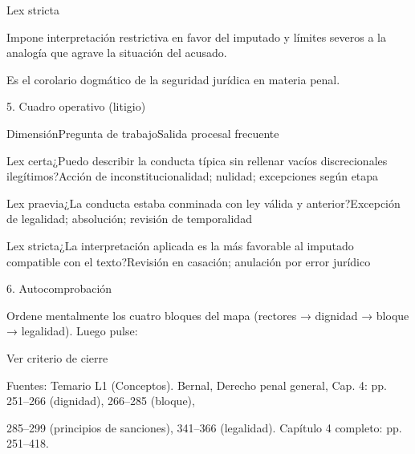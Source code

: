 \documentclass[11pt,a4paper]{article}
\begin{document}
          Lex stricta\par

            Impone interpretación restrictiva en favor del imputado y límites severos a la analogía que agrave la situación del acusado.\par
            Es el corolario dogmático de la seguridad jurídica en materia penal.\par









      5. Cuadro operativo (litigio)\par



          DimensiónPregunta de trabajoSalida procesal frecuente\par




          Lex certa¿Puedo describir la conducta típica sin rellenar vacíos discrecionales ilegítimos?Acción de inconstitucionalidad; nulidad; excepciones según etapa\par

          Lex praevia¿La conducta estaba conminada con ley válida y anterior?Excepción de legalidad; absolución; revisión de temporalidad\par

          Lex stricta¿La interpretación aplicada es la más favorable al imputado compatible con el texto?Revisión en casación; anulación por error jurídico\par








      6. Autocomprobación\par

      Ordene mentalmente los cuatro bloques del mapa (rectores → dignidad → bloque → legalidad). Luego pulse:\par

      Ver criterio de cierre\par





      Fuentes: Temario L1 (Conceptos). Bernal, Derecho penal general, Cap. 4: pp. 251–266 (dignidad), 266–285 (bloque),\par
      285–299 (principios de sanciones), 341–366 (legalidad). Capítulo 4 completo: pp. 251–418.\par
\end{document}
